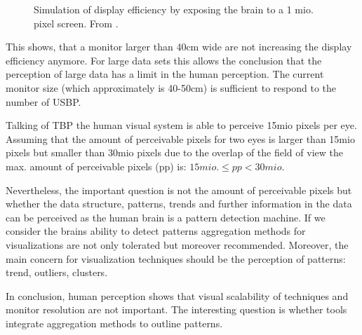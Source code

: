 \begin{figure}[H]
    \centering
    \caption{Simulation of display efficiency by exposing the brain to a 1 mio. pixel screen. From \cite{Ware2012a}.}
    \label{fig:DE}
\end{figure}

This shows, that a monitor larger than 40cm wide are not increasing the display efficiency anymore. For large data sets this allows the conclusion that the perception of large data has a limit in the human perception. The current monitor size (which approximately is  40-50cm) is sufficient to respond to the number of USBP.

Talking of TBP  the human visual system is able to perceive 15mio pixels per eye\cite{Deering1998}. Assuming that the amount of perceivable pixels for two eyes is larger than 15mio pixels but smaller than 30mio pixels due to the overlap of the field of view the max. amount of perceivable pixels (pp) is:
\begin{math}
15 mio. \leq pp < 30 mio.
\end{math}

Nevertheless, the important question is not the amount of perceivable pixels but whether the data structure, patterns, trends and further information in the data can be perceived as the human brain is a pattern detection machine\cite{Ware2012a}. If we consider the brains ability to detect patterns aggregation methods for visualizations are not only tolerated but moreover recommended. Moreover, the main concern for visualization techniques should be the perception of patterns: trend, outliers, clusters. 
\par
In conclusion, human perception shows that visual scalability of techniques and monitor resolution are not important. The interesting question is whether tools integrate aggregation methods to outline patterns.

